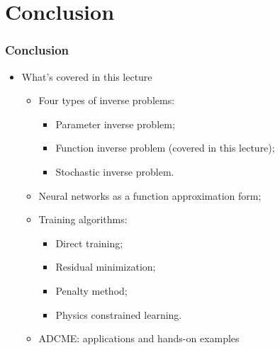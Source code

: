 \documentclass{beamer}
\begin{document}
\section{Conclusion}


\begin{frame}
	\frametitle{Conclusion}
	\begin{itemize}
		\item What's covered in this lecture
		\begin{itemize}
		\item Four types of inverse problems: 
		\begin{itemize}
			\item Parameter inverse problem;
			\item Function inverse problem (covered in this lecture);
			\item Stochastic inverse problem.
		\end{itemize}
		\item Neural networks as a function approximation form;
		\item Training algorithms:
		\begin{itemize}
		\item Direct training;
		\item Residual minimization;
		\item Penalty method;
		\item Physics constrained learning.
		\end{itemize}
		\item ADCME: applications and hands-on examples
		\end{itemize}
	\end{itemize}
\end{frame}
\end{document}
